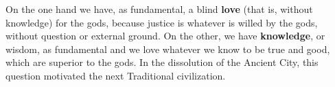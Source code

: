 On the one hand we have, as fundamental, a blind \textbf{love} (that is, without knowledge) for the gods, because justice is whatever is willed by the gods, without question or external ground. On the other, we have \textbf{knowledge}, or wisdom, as fundamental and we love whatever we know to be true and good, which are superior to the gods. In the dissolution of the Ancient City, this question motivated the next Traditional civilization.



